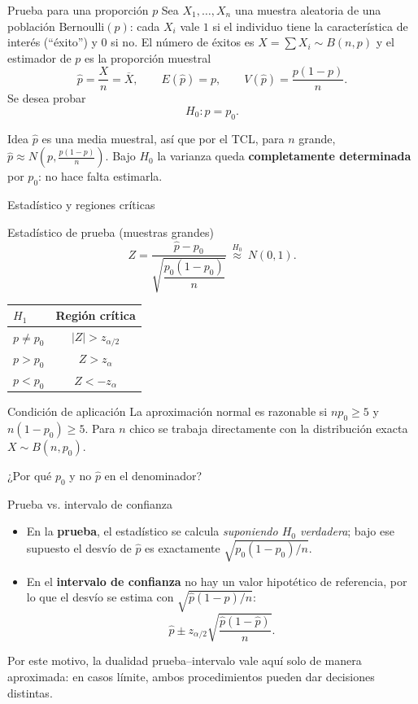 \documentclass[aspectratio=169,11pt]{beamer}
\begin{document}
\begin{frame}{Prueba para una proporción $p$}
Sea $X_1,\dots,X_n$ una muestra aleatoria de una población Bernoulli$(p)$: cada $X_i$ vale $1$ si el individuo tiene la característica de interés (``éxito'') y $0$ si no. El número de éxitos es $X=\sum X_i\sim B(n,p)$ y el estimador de $p$ es la proporción muestral
\[
\hat p=\frac{X}{n}=\overline{X}, \qquad E(\hat p)=p, \qquad V(\hat p)=\frac{p(1-p)}{n}.
\]
Se desea probar
\[
H_0: p=p_0.
\]

\begin{block}{Idea}
$\hat p$ es una media muestral, así que por el TCL, para $n$ grande, $\hat p\approx N\!\left(p,\tfrac{p(1-p)}{n}\right)$. Bajo $H_0$ la varianza queda \textbf{completamente determinada} por $p_0$: no hace falta estimarla.
\end{block}
\end{frame}

\begin{frame}{Estadístico y regiones críticas}
\begin{block}{Estadístico de prueba (muestras grandes)}
\[
Z=\frac{\hat p-p_0}{\sqrt{\dfrac{p_0(1-p_0)}{n}}} \ \overset{H_0}{\approx}\ N(0,1).
\]
\end{block}

\begin{table}[]
\centering
\small
\begin{tabular}{@{}lc@{}}
\toprule
$H_1$ & Región crítica \\
\midrule
$p\neq p_0$ & $|Z|>z_{\alpha/2}$ \\
$p>p_0$ & $Z>z_{\alpha}$ \\
$p<p_0$ & $Z<-z_{\alpha}$ \\
\bottomrule
\end{tabular}
\end{table}

\begin{alertblock}{Condición de aplicación}
La aproximación normal es razonable si $np_0\ge5$ y $n(1-p_0)\ge5$. Para $n$ chico se trabaja directamente con la distribución exacta $X\sim B(n,p_0)$.
\end{alertblock}
\end{frame}

\begin{frame}{¿Por qué $p_0$ y no $\hat p$ en el denominador?}
\begin{block}{Prueba vs. intervalo de confianza}
\begin{itemize}
\item En la \textbf{prueba}, el estadístico se calcula \emph{suponiendo $H_0$ verdadera}; bajo ese supuesto el desvío de $\hat p$ es exactamente $\sqrt{p_0(1-p_0)/n}$.
\item En el \textbf{intervalo de confianza} no hay un valor hipotético de referencia, por lo que el desvío se estima con $\sqrt{\hat p(1-\hat p)/n}$:
\[
\hat p\pm z_{\alpha/2}\sqrt{\frac{\hat p(1-\hat p)}{n}}.
\]
\end{itemize}
\end{block}
Por este motivo, la dualidad prueba–intervalo vale aquí solo de manera aproximada: en casos límite, ambos procedimientos pueden dar decisiones distintas.
\end{frame}
\end{document}
